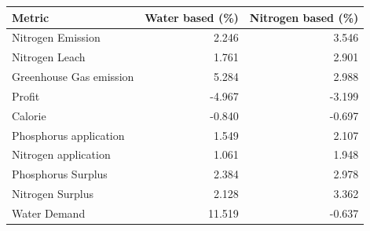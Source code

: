 \begin{tabular}{lrr}
\toprule
Metric & Water based (\%) & Nitrogen based (\%) \\
\midrule
Nitrogen Emission & 2.246 & 3.546 \\
Nitrogen Leach & 1.761 & 2.901 \\
Greenhouse Gas emission & 5.284 & 2.988 \\
Profit & -4.967 & -3.199 \\
Calorie & -0.840 & -0.697 \\
Phosphorus application & 1.549 & 2.107 \\
Nitrogen application & 1.061 & 1.948 \\
Phosphorus Surplus & 2.384 & 2.978 \\
Nitrogen Surplus & 2.128 & 3.362 \\
Water Demand & 11.519 & -0.637 \\
\bottomrule
\end{tabular}
